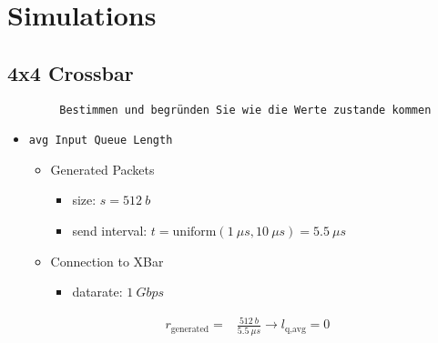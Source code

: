 \documentclass[]{scrartcl}
\begin{document}
    \section{Simulations}
    \subsection{4x4 Crossbar}
    \begin{verbatim}
        Bestimmen und begründen Sie wie die Werte zustande kommen
    \end{verbatim}

    \begin{itemize}
        \item \verb|avg Input Queue Length|
            \begin{itemize}
                \item Generated Packets
                    \begin{itemize}
                        \item size: $ s = \SI{512}{b}$
                        \item send interval: $ t = \text{uniform}(\SI{1}{\mu s}, \SI{10}{\mu s}) = \SI{5.5}{\mu s}$
                    \end{itemize}
                \item Connection to XBar
                    \begin{itemize}
                        \item datarate: $\SI{1}{Gbps}$
                    \end{itemize}
            \end{itemize}

        \begin{align}
            r_\text{generated} =& \frac{\SI{512}{b}}{\SI{5.5}{\mu s}}
            \rightarrow l_\text{q,avg} = 0
        \end{align}


\end{itemize}
\end{document}

